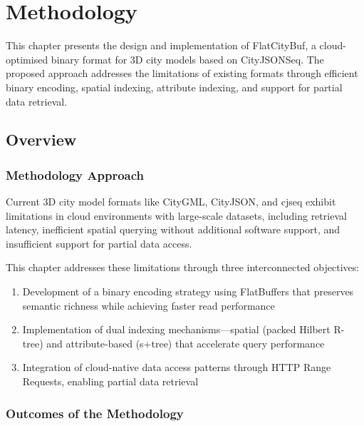 
\chapter{Methodology}
\label{methodology}

This chapter presents the design and implementation of FlatCityBuf, a cloud-optimised binary format for 3D city models based on CityJSONSeq. The proposed approach addresses the limitations of existing formats through efficient binary encoding, spatial indexing, attribute indexing, and support for partial data retrieval.

\section{Overview}
\label{methodology:overview}

\subsection{Methodology Approach}
\label{methodology:overview:approach}

Current 3D city model formats like CityGML, CityJSON, and \ac{cjseq} exhibit limitations in cloud environments with large-scale datasets, including retrieval latency, inefficient spatial querying without additional software support, and insufficient support for partial data access.

This chapter addresses these limitations through three interconnected objectives:

\begin{enumerate}
  \item Development of a binary encoding strategy using FlatBuffers that preserves semantic richness while achieving faster read performance
  \item Implementation of dual indexing mechanisms—spatial (packed Hilbert R-tree) and attribute-based (\ac{s+tree}) that accelerate query performance
  \item Integration of cloud-native data access patterns through HTTP Range Requests, enabling partial data retrieval
\end{enumerate}

\subsection{Outcomes of the Methodology}
\label{methodology:overview:outcomes}

